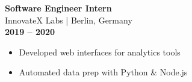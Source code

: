 \hspace{0.5cm}
\begin{minipage}[t]{6.5cm}
\textbf{\large Software Engineer Intern} \\
InnovateX Labs | Berlin, Germany \\
\textbf{2019 -- 2020}
\begin{itemize}[leftmargin=15pt, itemsep=2pt, topsep=5pt]
  \item Developed web interfaces for analytics tools
  \item Automated data prep with Python \& Node.js
\end{itemize}
\end{minipage}
